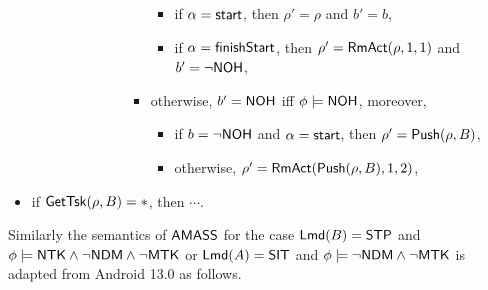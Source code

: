 \begin{itemize}
\begin{itemize}
\begin{itemize}
\begin{itemize}
\begin{itemize}
\begin{itemize}
				\begin{itemize}
					\item if $\alpha = {\mathsf{start} }$, then $\rho' = \rho$ and $b' = b$,
					\item if $\alpha = {\mathsf{finishStart} }$, then $\rho' = \mathsf{RmAct}(\rho, 1, 1)$ and $b' = \neg{\sf NOH}$,
				\end{itemize}
				\item otherwise, $b' = {\sf NOH}$ iff $\phi \models {\sf NOH}$, moreover, 
				\begin{itemize}
					\item if $b = \neg {\sf NOH}$ and $\alpha = {\mathsf{start} }$, then $\rho'=\mathsf{Push}(\rho, B)$,
					\item otherwise, $\rho' = \mathsf{RmAct}(\mathsf{Push}(\rho, B), 1, 2)$, 
				\end{itemize}
			\end{itemize}
            \end{itemize}
        \end{itemize}
    \end{itemize}
\end{itemize}
\item if $\mathsf{GetTsk}(\rho, B) = *$, then $\cdots$. 
\end{itemize}
Similarly the semantics of $\textsf{AMASS}$ for the case ${\sf Lmd}(B) = {\sf STP}$ and $\phi \models {\sf NTK} \wedge \neg {\sf NDM}\wedge \neg {\sf MTK}$ or ${\sf Lmd}(A) = {\sf SIT}$ and $\phi \models \neg{\sf NDM}\wedge\neg{\sf MTK}$ is adapted from Android 13.0 as follows.

